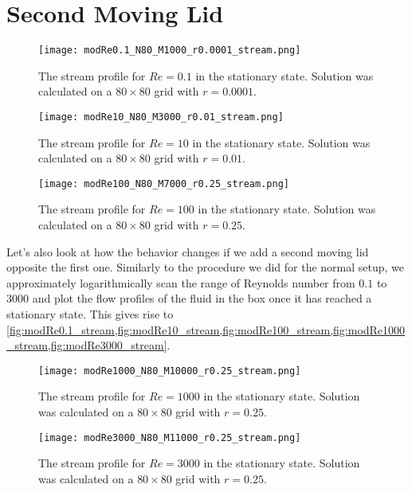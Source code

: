 \documentclass[10pt,a4paper,twocolumn]{article}
\begin{document}
\section{Second Moving Lid}

\begin{figure}[!b]
    \centering
    \texttt{[image: modRe0.1\_N80\_M1000\_r0.0001\_stream.png]}
    \caption{The stream profile for $Re=0.1$ in the stationary state. Solution was calculated on a $80 \times 80$ grid with $r=0.0001$.}
    \label{fig:modRe0.1_stream}
\end{figure}

\begin{figure}[!h]
    \centering
    \texttt{[image: modRe10\_N80\_M3000\_r0.01\_stream.png]}
    \caption{The stream profile for $Re=10$ in the stationary state. Solution was calculated on a $80 \times 80$ grid with $r=0.01$.}
    \label{fig:modRe10_stream}
\end{figure}

\begin{figure}[!b]
    \centering
    \texttt{[image: modRe100\_N80\_M7000\_r0.25\_stream.png]}
    \caption{The stream profile for $Re=100$ in the stationary state. Solution was calculated on a $80 \times 80$ grid with $r=0.25$.}
    \label{fig:modRe100_stream}
\end{figure}

Let's also look at how the behavior changes if we add a second moving lid opposite the first one. Similarly to the procedure we did for the normal setup, we approximately logarithmically scan the range of Reynolds number from $0.1$ to $3000$ and plot the flow profiles of the fluid in the box once it has reached a stationary state. This gives rise to \cref{fig:modRe0.1_stream,fig:modRe10_stream,fig:modRe100_stream,fig:modRe1000_stream,fig:modRe3000_stream}.


\begin{figure}[!b]
    \centering
    \texttt{[image: modRe1000\_N80\_M10000\_r0.25\_stream.png]}
    \caption{The stream profile for $Re=1000$ in the stationary state. Solution was calculated on a $80 \times 80$ grid with $r=0.25$.}
    \label{fig:modRe1000_stream}
\end{figure}

\begin{figure}[!b]
    \centering
    \texttt{[image: modRe3000\_N80\_M11000\_r0.25\_stream.png]}
    \caption{The stream profile for $Re=3000$ in the stationary state. Solution was calculated on a $80 \times 80$ grid with $r=0.25$.}
    \label{fig:modRe3000_stream}
\end{figure}
\end{document}
